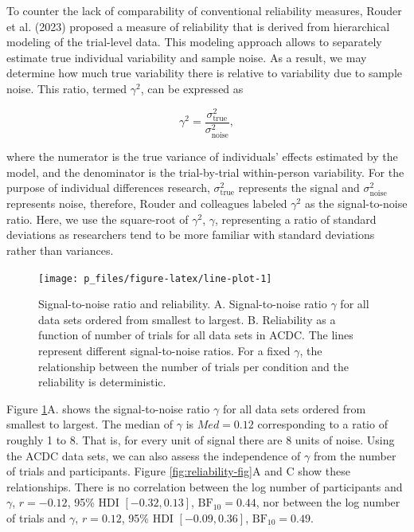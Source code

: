 \documentclass[
  man,floatsintext]{apa6}
\begin{document}
To counter the lack of comparability of conventional reliability measures, Rouder et al. (2023) proposed a measure of reliability that is derived from hierarchical modeling of the trial-level data. This modeling approach allows to separately estimate true individual variability and sample noise. As a result, we may determine how much true variability there is relative to variability due to sample noise. This ratio, termed \(\gamma^2\), can be expressed as

\[\gamma^2 = \frac{\sigma^2_{\text{true}}}{\sigma^2_{\text{noise}}},\]

where the numerator is the true variance of individuals' effects estimated by the model, and the denominator is the trial-by-trial within-person variability. For the purpose of individual differences research, \(\sigma^2_{\text{true}}\) represents the signal and \(\sigma^2_{\text{noise}}\) represents noise, therefore, Rouder and colleagues labeled \(\gamma^2\) as the signal-to-noise ratio. Here, we use the square-root of \(\gamma^2\), \(\gamma\), representing a ratio of standard deviations as researchers tend to be more familiar with standard deviations rather than variances.



\begin{figure}

{\centering \texttt{[image: p\_files/figure-latex/line-plot-1]} 

}

\caption{Signal-to-noise ratio and reliability. A. Signal-to-noise ratio \(\gamma\) for all data sets ordered from smallest to largest. B. Reliability as a function of number of trials for all data sets in ACDC. The lines represent different signal-to-noise ratios. For a fixed \(\gamma\), the relationship between the number of trials per condition and the reliability is deterministic.}\label{fig:line-plot}
\end{figure}

Figure \ref{fig:line-plot}A. shows the signal-to-noise ratio \(\gamma\) for all data sets ordered from smallest to largest. The median of \(\gamma\) is \(Med = 0.12\) corresponding to a ratio of roughly 1 to 8. That is, for every unit of signal there are 8 units of noise. Using the ACDC data sets, we can also assess the independence of \(\gamma\) from the number of trials and participants. Figure \ref{fig:reliability-fig}A and C show these relationships. There is no correlation between the log number of participants and \(\gamma\), \(r = -0.12\), 95\% HDI \([-0.32, 0.13]\), \(\mathrm{BF}_{\textrm{10}} = 0.44\), nor between the log number of trials and \(\gamma\), \(r = 0.12\), 95\% HDI \([-0.09, 0.36]\), \(\mathrm{BF}_{\textrm{10}} = 0.49\).
\end{document}

